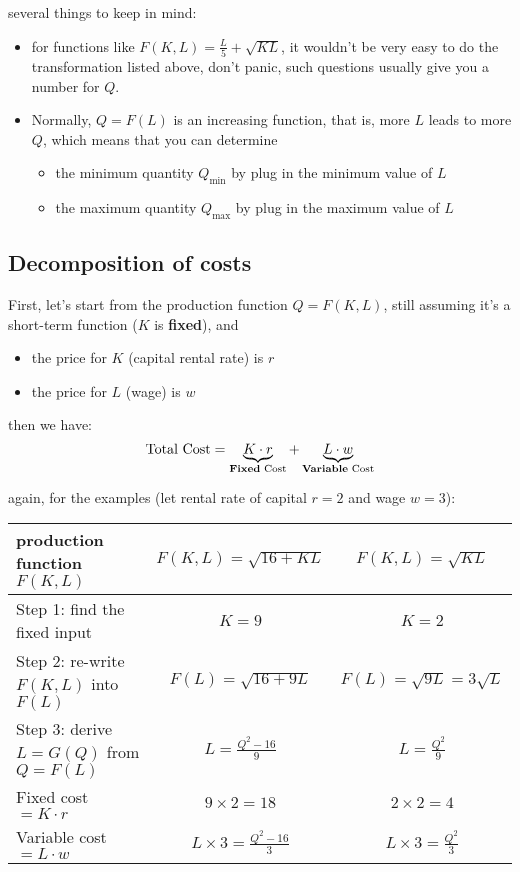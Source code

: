 \documentclass[twoside]{article}
\theoremstyle{definition}
\begin{document}
several things to keep in mind:
\begin{itemize}
    \item for functions like $F(K,L)=\frac{L}{5}+\sqrt{KL}$, it wouldn't be very easy to do the transformation listed above, don't panic, such questions usually give you a number for $Q$.
    \item Normally, $Q=F(L)$ is an increasing function, that is, more $L$ leads to more $Q$, which means that you can determine
    \begin{itemize}
        \item the minimum quantity $Q_{\min}$ by plug in the minimum value of $L$
        \item the maximum quantity $Q_{\max}$ by plug in the maximum value of $L$
    \end{itemize}
\end{itemize}

\subsection{Decomposition of costs}

First, let's start from the production function $Q=F(K,L)$, still assuming it's a short-term function ($K$ is \textbf{fixed}), and
\begin{itemize}
    \item the price for $K$ (capital rental rate) is $r$
    \item the price for $L$ (wage) is $w$
\end{itemize}

then we have:
$$
\text{Total Cost} = \underbrace{K\cdot r}_{\text{\textbf{Fixed} Cost}} + \underbrace{L\cdot w}_{\text{\textbf{Variable} Cost}}
$$

again, for the examples (let rental rate of capital $r=2$ and wage $w=3$):
\begin{table}[ht]
\centering
    \begin{tabular}{l|cc}
         production function $F(K,L)$ & $F(K,L)=\sqrt{16+KL}$ & $F(K,L)=\sqrt{KL}$ \\
        \hline
        Step 1: find the fixed input & $K=9$ & $K=2$  \\
        Step 2: re-write $F(K,L)$ into $F(L)$ & $F(L)=\sqrt{16+9L}$ & $F(L)=\sqrt{9L}=3\sqrt{L}$ \\
        Step 3: derive $L=G(Q)$ from $Q=F(L)$ & $L=\frac{Q^2-16}{9}$ & $L=\frac{Q^2}{9}$\\
        \hline
        Fixed cost $=K\cdot r$ & $9\times 2=18$ & $2\times 2 =4$\\
        Variable cost $=L\cdot w$ & $L\times 3 = \frac{Q^2-16}{3}$& $L\times 3 = \frac{Q^2}{3}$
    \end{tabular}
\end{table}
\end{document}
